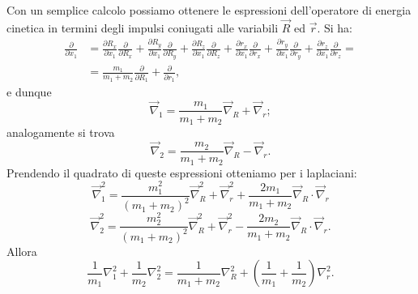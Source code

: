 \documentclass[a4paper,12pt,oneside]{book}
\begin{document}
Con un semplice calcolo possiamo ottenere le espressioni dell'operatore di energia cinetica in termini degli impulsi coniugati alle variabili $\vec{R}$ ed $\vec{r}$. Si ha:
	\begin{align} 
		\frac{\partial}{\partial x_1} & = \frac{\partial R_x}{\partial x_1} \frac{\partial}{\partial R_x}+\frac{\partial R_y}{\partial x_1} \frac{\partial}{\partial R_y}+\frac{\partial R_z}{\partial x_1} \frac{\partial}{\partial R_z}+\frac{\partial r_x}{\partial x_1} \frac{\partial}{\partial r_x}+\frac{\partial r_y}{\partial x_1} \frac{\partial}{\partial r_y}+\frac{\partial r_z}{\partial x_1} \frac{\partial}{\partial r_z}= \nonumber\\
 		& = \frac{m_1}{m_1+m_2}\frac{\partial}{\partial R_1}+\frac{\partial}{\partial r_1} ,
	\end{align}
e dunque
	\begin{equation}
		\vec{\nabla}_1=\frac{m_1}{m_1+m_2}\vec{\nabla}_R+\vec{\nabla}_r;
	\end{equation}
analogamente si trova
	\begin{equation}
		\vec{\nabla}_2=\frac{m_2}{m_1+m_2}\vec{\nabla}_R-\vec{\nabla}_r.
	\end{equation}
Prendendo il quadrato di queste espressioni otteniamo per i laplaciani:
	\begin{equation}
		\vec{\nabla}_1^2=\frac{m_1^2}{\left(m_1+m_2\right)^2}\vec{\nabla}_R^2+\vec{\nabla}_r^2+\frac{2m_1}{m_1+m_2}\vec{\nabla}_R\cdot\vec{\nabla}_r
	\end{equation}
\begin{equation}
\vec{\nabla}_2^2=\frac{m_2^2}{\left(m_1+m_2\right)^2}\vec{\nabla}_R^2+\vec{\nabla}_r^2-\frac{2m_2}{m_1+m_2}\vec{\nabla}_R\cdot\vec{\nabla}_r.
\end{equation}
Allora
\begin{equation}
\frac{1}{m_1}\nabla_1^2+\frac{1}{m_2}\nabla_2^2=\frac{1}{m_1+m_2}\nabla_R^2+\left(\frac{1}{m_1}+\frac{1}{m_2}\right)\nabla_r^2 .
\end{equation}\\
\end{document}
